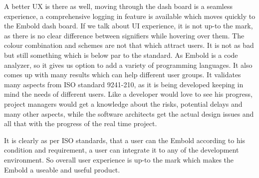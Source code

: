 A better UX is there as well, moving through the dash board is a seamless experience, a comprehensive logging in feature is available which moves quickly to the Embold dash board. 
If we talk about UI experience, it is not up-to the mark, as there is no clear difference between signifiers while hovering over them. The colour combination and schemes are not that which attract users. It is not as bad but still something which is below par to the standard. 
As Embold is a code analyzer, so it gives us option to add a variety of programming languages. It also comes up with many results which can help different user groups. It validates many aspects from ISO standard 9241-210, as it is being developed keeping in mind the needs of different users. Like a developer would love to see his progress, project managers would get a knowledge about the risks, potential delays and many other aspects, while the software architects get the actual design issues and all that with the progress of the real time project. \par
It is clearly as per ISO standards, that a user can the Embold according to his condition and requirement, a user can integrate it to any of the development environment. So overall user experience is up-to the mark which makes the Embold a useable and useful product. 